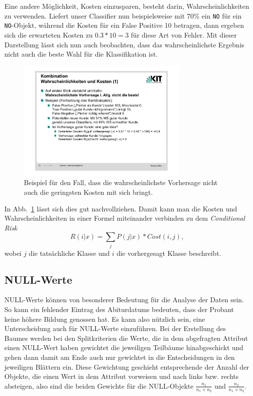 Eine andere Möglichkeit, Kosten einzusparen, besteht darin, Wahrscheinlichkeiten
zu verwenden. Liefert unser Classifier nun beispielsweise mit \(70\%\) ein
\texttt{NO} für ein \texttt{NO}-Objekt, während die Kosten für ein False Positive 10 betragen,
dann ergeben sich die erwarteten Kosten zu \(0.3 * 10 = 3\) für diese Art von
Fehler. Mit dieser Darstellung
lässt sich nun auch beobachten, dass das wahrscheinlichste Ergebnis nicht auch
die beste Wahl für die Klassifikation ist.

\begin{figure}[ht]
	\centering
	\includegraphics[width=0.75\textwidth]{Figures/classifier}
	\caption[Beispiel Classifier]{Beispiel für  den Fall, dass
	die wahrscheinlichste Vorhersage nicht auch die geringsten Kosten
	mit sich bringt. \footnotemark}
	\label{fig:classifier_ex}
\end{figure}

In Abb.~\ref{fig:classifier_ex} lässt sich dies gut nachvollziehen. Damit kann
man die Kosten und Wahrscheinlichkeiten in einer Formel miteinander verbinden
zu dem \textit{Conditional Risk}
\[
	R(i|x) = \sum_j P(j|x) * Cost(i,j),
\]
wobei \(j\) die tatsächliche Klasse und \(i\) die vorhergesagt Klasse beschreibt.


\subsection{NULL-Werte}
NULL-Werte können von besonderer Bedeutung für die Analyse der Daten sein. So
kann ein fehlender Eintrag des Abiturdatums bedeuten, dass der Probant keine
höhere Bildung genossen hat. Es kann also nützlich sein, eine Unterscheidung auch
für NULL-Werte einzuführen. Bei der Erstellung des Baumes werden bei den
Splitkriterien die Werte, die in dem abgefragten Attribut einen NULL-Wert haben
gewichtet die jeweiligen Teilbäume hinabgeschickt und gehen dann damit am Ende auch
nur gewichtet in die Entscheidungen in den jeweiligen Blättern ein. Diese Gewichtung
geschieht entsprechende der Anzahl der Objekte, die einen Wert in dem Attribut vorweisen
und nach links bzw. rechts absteigen, also sind die beiden Gewichte für die 
NULL-Objekte \(\frac{n_1}{n_1 + n_2}\) und \(\frac{n_2}{n_1 + n_2}\).
